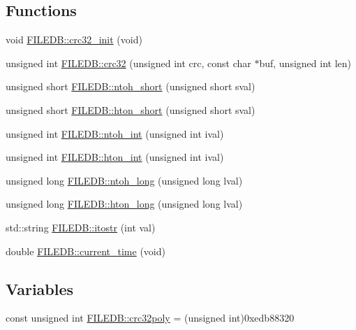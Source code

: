 \subsection*{Functions}
\begin{DoxyCompactItemize}
\item 
void \mbox{\hyperlink{namespaceFILEDB_ad0296230a6c6ba4b757820d4367275a4}{F\+I\+L\+E\+D\+B\+::crc32\+\_\+init}} (void)
\item 
unsigned int \mbox{\hyperlink{namespaceFILEDB_aa12ea161a9698d1b53c1026b06f0b0a5}{F\+I\+L\+E\+D\+B\+::crc32}} (unsigned int crc, const char $\ast$buf, unsigned int len)
\item 
unsigned short \mbox{\hyperlink{namespaceFILEDB_af28aef063f95fcb331d3844f6807daf5}{F\+I\+L\+E\+D\+B\+::ntoh\+\_\+short}} (unsigned short sval)
\item 
unsigned short \mbox{\hyperlink{namespaceFILEDB_acbb57ab648e150c1950a7e6a67a6aa56}{F\+I\+L\+E\+D\+B\+::hton\+\_\+short}} (unsigned short sval)
\item 
unsigned int \mbox{\hyperlink{namespaceFILEDB_ab34ff6954f1b3a0dc868119d34105579}{F\+I\+L\+E\+D\+B\+::ntoh\+\_\+int}} (unsigned int ival)
\item 
unsigned int \mbox{\hyperlink{namespaceFILEDB_adbce406e3e06947d7312a6d461bc5cc5}{F\+I\+L\+E\+D\+B\+::hton\+\_\+int}} (unsigned int ival)
\item 
unsigned long \mbox{\hyperlink{namespaceFILEDB_af2fbdeeb7148fa47d1050b1ac3130897}{F\+I\+L\+E\+D\+B\+::ntoh\+\_\+long}} (unsigned long lval)
\item 
unsigned long \mbox{\hyperlink{namespaceFILEDB_af381773a642a4cc9c68ce682cea411a8}{F\+I\+L\+E\+D\+B\+::hton\+\_\+long}} (unsigned long lval)
\item 
std\+::string \mbox{\hyperlink{namespaceFILEDB_a00ba2326eea8f8eb8dc3b4be5eac2bf3}{F\+I\+L\+E\+D\+B\+::itostr}} (int val)
\item 
double \mbox{\hyperlink{namespaceFILEDB_a52d0505cdd535797c05bffb0598ef2a5}{F\+I\+L\+E\+D\+B\+::current\+\_\+time}} (void)
\end{DoxyCompactItemize}
\subsection*{Variables}
\begin{DoxyCompactItemize}
\item 
const unsigned int \mbox{\hyperlink{namespaceFILEDB_a8a86234763af41b14f1cfcf436e8674f}{F\+I\+L\+E\+D\+B\+::crc32poly}} = (unsigned int)0xedb88320
\end{DoxyCompactItemize}


